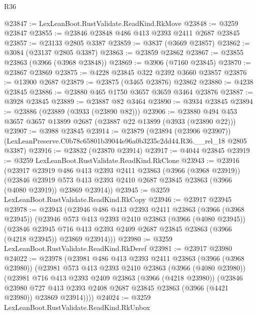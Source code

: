 \begin{lexlean}{R36}
\begin{coremodule}
@23847 := LexLeanBoot.RustValidate.ReadKind.RkMove
@23848 := @3259 @23847
@23855 := @23846 @23848 @486 @413 @2393 @2411 @2687 @23845
@23857 := @23133 @2805 @3387
@23859 := @3837 (@3669 @23857)
@23862 := @3084 (@23137 @2805 @3387)
@23863 := @23859 @23862
@23867 := @23855 @23863 (@3966 (@3968 @23848))
@23869 := @3906 (@7160 @23845)
@23870 := @23867 @23869
@23875 := @4228 @23845 @322 @2392 @3660 @23857
@23876 := @13900 @2687
@23879 := @23875 (@3465 @23876) @23862
@23880 := @4238 @23845
@23886 := @23880 @465 @1750 @3657 @3659 @3464 @23876
@23887 := @3928 @23845
@23889 := @23887 @82 @3464
@23890 := @3934 @23845
@23894 := @23886 (@23889 (@3933 (@23890 @82)))
@23906 := @23880 @494 @453 @3657 @3657 @13899 @2687 (@23887 @22 @13899 (@3933 (@23890 @22)))
@23907 := @3988 @23845
@23914 := @23879
    (@23894 (@23906 @23907))
    (LexLeanPreserve.C0b78c65801b39044e96a0b3235c2dd44.R36.__rel_18 @2805 @3387)
@23916 := @23832 (@23870 @23914)
@23917 := @4044 @23845
@23919 := @3259 LexLeanBoot.RustValidate.ReadKind.RkClone
@23943 := @23916
    (@23917
      @23919
      @486
      @413
      @2393
      @2411
      @23863
      (@3966 (@3968 @23919))
      (@23846
        @23919
        @573
        @413
        @2393
        @2410
        @2687
        @23845
        @23863
        (@3966 (@4080 @23919))
        @23869
        @23914))
@23945 := @3259 LexLeanBoot.RustValidate.ReadKind.RkCopy
@23946 := @23917 @23945
@23978 := @23943
    (@23946
      @486
      @413
      @2393
      @2411
      @23863
      (@3966 (@3968 @23945))
      (@23946
        @573
        @413
        @2393
        @2410
        @23863
        (@3966 (@4080 @23945))
        (@23846
          @23945
          @716
          @413
          @2393
          @2409
          @2687
          @23845
          @23863
          (@3966 (@4218 @23945))
          @23869
          @23914)))
@23980 := @3259 LexLeanBoot.RustValidate.ReadKind.RkDeref
@23981 := @23917 @23980
@24022 := @23978
    (@23981
      @486
      @413
      @2393
      @2411
      @23863
      (@3966 (@3968 @23980))
      (@23981
        @573
        @413
        @2393
        @2410
        @23863
        (@3966 (@4080 @23980))
        (@23981
          @716
          @413
          @2393
          @2409
          @23863
          (@3966 (@4218 @23980))
          (@23846
            @23980
            @727
            @413
            @2393
            @2408
            @2687
            @23845
            @23863
            (@3966 (@4421 @23980))
            @23869
            @23914))))
@24024 := @3259 LexLeanBoot.RustValidate.ReadKind.RkUnbox

\end{coremodule}
\end{lexlean}
